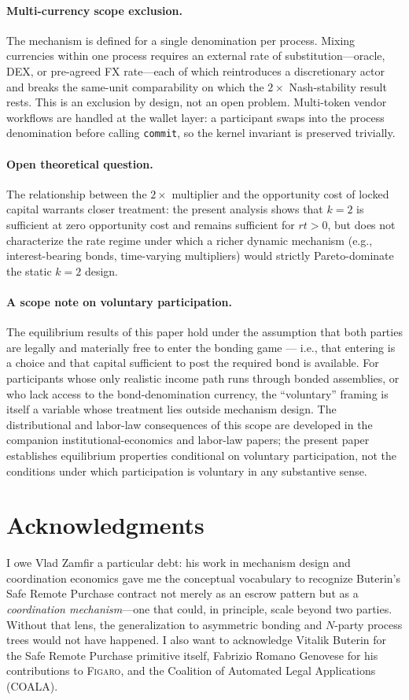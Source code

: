 \documentclass[11pt,a4paper]{article}
\theoremstyle{definition}
\theoremstyle{remark}
\newcommand{\figaro}{\textsc{Figaro}}
\begin{document}
\paragraph{Multi-currency scope exclusion.}
The mechanism is defined for a single denomination per process.
Mixing currencies within one process requires an external rate of
substitution---oracle, DEX, or pre-agreed FX rate---each of which
reintroduces a discretionary actor and breaks the same-unit
comparability on which the $2\times$ Nash-stability result rests.
This is an exclusion by design, not an open problem. Multi-token
vendor workflows are handled at the wallet layer: a participant
swaps into the process denomination before calling
\texttt{commit}, so the kernel invariant is preserved trivially.

\paragraph{Open theoretical question.}
The relationship between the $2\times$ multiplier and the
opportunity cost of locked capital warrants closer treatment: the
present analysis shows that $k = 2$ is sufficient at zero
opportunity cost and remains sufficient for $rt > 0$, but does not
characterize the rate regime under which a richer dynamic mechanism
(e.g., interest-bearing bonds, time-varying multipliers) would
strictly Pareto-dominate the static $k = 2$ design.

\paragraph{A scope note on voluntary participation.}
The equilibrium results of this paper hold under the assumption
that both parties are legally and materially free to enter the
bonding game --- i.e., that entering is a choice and that capital
sufficient to post the required bond is available. For
participants whose only realistic income path runs through bonded
assemblies, or who lack access to the bond-denomination currency,
the ``voluntary'' framing is itself a variable whose treatment
lies outside mechanism design. The distributional and labor-law
consequences of this scope are developed in the companion
institutional-economics and labor-law papers; the present paper
establishes equilibrium properties conditional on voluntary
participation, not the conditions under which participation is
voluntary in any substantive sense.

\section*{Acknowledgments}
I owe Vlad Zamfir a particular debt: his work in mechanism design and
coordination economics gave me the conceptual vocabulary to recognize
Buterin's Safe Remote Purchase contract not merely as an escrow pattern
but as a \emph{coordination mechanism}---one that could, in principle,
scale beyond two parties. Without that lens, the generalization to
asymmetric bonding and $N$-party process trees would not have happened.
I also want to acknowledge Vitalik Buterin for the Safe Remote Purchase
primitive itself, Fabrizio Romano Genovese for his contributions to
\figaro{}, and the Coalition of Automated Legal Applications (COALA).
\end{document}
